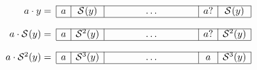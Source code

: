 \documentclass[10pt]{article}
\begin{document}
\TeXtoEPS
\(
\begin{array}{r@{}ccccc}
\cline{2-6}
  \multicolumn{1}{r|}{a \cdot y =}
& \multicolumn{1}{c|}{a}
& \multicolumn{1}{c|}{\Border{}{y}}
& \phantom{HHHH}\ldots\phantom{HHHH}
& \multicolumn{1}{|c|}{a?}
& \multicolumn{1}{c|}{\Border{}{y}}\\
\cline{2-6}
&&&&&\\
\cline{2-6}
  \multicolumn{1}{r|}{a \cdot \Border{}{y} =}
& \multicolumn{1}{c|}{a}
& \multicolumn{1}{c|}{\Border{2}{y}}
& \ldots
& \multicolumn{1}{|c|}{a?}
& \multicolumn{1}{c|}{\Border{2}{y}}\\
\cline{2-6}
&&&&&\\
\cline{2-6}
  \multicolumn{1}{r|}{a \cdot \Border{2}{y} =}
& \multicolumn{1}{c|}{a}
& \multicolumn{1}{c|}{\Border{3}{y}}
& \ldots
& \multicolumn{1}{|c|}{a}
& \multicolumn{1}{c|}{\Border{3}{y}}\\
\cline{2-6}
\end{array}
\)
\endTeXtoEPS
\end{document}

